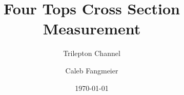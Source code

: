 \documentclass[english,aspectratio=169]{beamer}
\begin{document}
\title[4t X-Section]{Four Tops Cross Section Measurement}

\subtitle{Trilepton Channel}

\author[C. Fangmeier]{Caleb Fangmeier}


\date{\today}


\begin{frame}[plain]
  \titlepage%
\end{frame}

\end{document}
